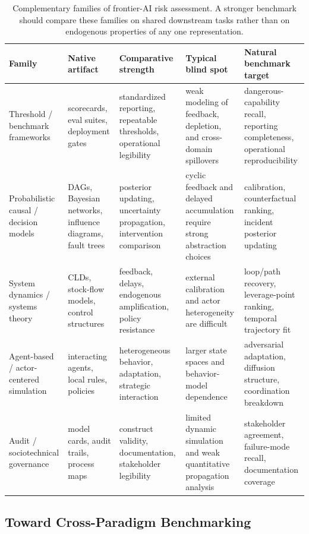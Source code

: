 \documentclass[11pt]{article}
\begin{document}
\begin{table}[t]
\centering
\caption{Complementary families of frontier-AI risk assessment. A stronger benchmark should compare these families on shared downstream tasks rather than on endogenous properties of any one representation.}
\label{tab:approach_landscape}
\small
\begin{tabularx}{\textwidth}{@{}p{2.55cm}p{2.35cm}p{2.9cm}p{2.9cm}X@{}}
\toprule
\textbf{Family} & \textbf{Native artifact} & \textbf{Comparative strength} & \textbf{Typical blind spot} & \textbf{Natural benchmark target} \\
\midrule
Threshold / benchmark frameworks & scorecards, eval suites, deployment gates & standardized reporting, repeatable thresholds, operational legibility & weak modeling of feedback, depletion, and cross-domain spillovers & dangerous-capability recall, reporting completeness, operational reproducibility \\
Probabilistic causal / decision models & DAGs, Bayesian networks, influence diagrams, fault trees & posterior updating, uncertainty propagation, intervention comparison & cyclic feedback and delayed accumulation require strong abstraction choices & calibration, counterfactual ranking, incident posterior updating \\
System dynamics / systems theory & CLDs, stock-flow models, control structures & feedback, delays, endogenous amplification, policy resistance & external calibration and actor heterogeneity are difficult & loop/path recovery, leverage-point ranking, temporal trajectory fit \\
Agent-based / actor-centered simulation & interacting agents, local rules, policies & heterogeneous behavior, adaptation, strategic interaction & larger state spaces and behavior-model dependence & adversarial adaptation, diffusion structure, coordination breakdown \\
Audit / sociotechnical governance & model cards, audit trails, process maps & construct validity, documentation, stakeholder legibility & limited dynamic simulation and weak quantitative propagation analysis & stakeholder agreement, failure-mode recall, documentation coverage \\
\bottomrule
\end{tabularx}
\end{table}

\subsection{Toward Cross-Paradigm Benchmarking}
\label{sec:benchmarking}
\end{document}
